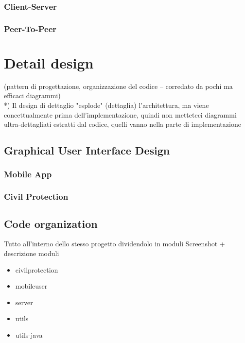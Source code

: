 \documentclass[a4paper,12pt]{report}
\begin{document}
\subsection{Client-Server}
\subsection{Peer-To-Peer}

\chapter{Detail design}
(pattern di progettazione, organizzazione del codice -- corredato da pochi ma efficaci diagrammi)\\
*) Il design di dettaglio "esplode" (dettaglia) l'architettura, ma viene concettualmente prima dell'implementazione, quindi non metteteci diagrammi ultra-dettagliati estratti dal codice, quelli vanno nella parte di implementazione

\section{Graphical User Interface Design}
\subsection{Mobile App}
\subsection{Civil Protection}

\section{Code organization}
Tutto all'interno dello stesso progetto dividendolo in moduli
Screenshot + descrizione moduli
\begin{itemize}
\item civilprotection
\item mobileuser
\item server
\item utils
\item utils-java
\end{itemize}
\end{document}
